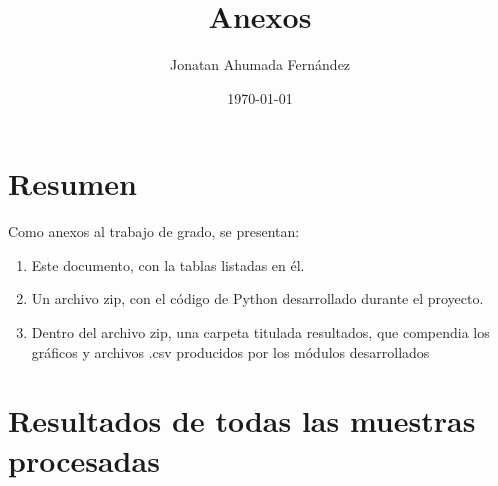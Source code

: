 \documentclass[11pt]{article}
\author{Jonatan Ahumada Fernández}
\date{\today}
\title{Anexos}
\begin{document}
\maketitle
\tableofcontents


\section{Resumen}
\label{sec:orgf2b99ac}

Como anexos al trabajo de grado, se presentan:

\begin{enumerate}
\item Este documento, con la tablas listadas en él.
\item Un archivo zip, con el código de Python desarrollado durante el
proyecto.
\item Dentro del archivo zip, una carpeta titulada resultados, que compendia los gráficos y archivos .csv producidos por los módulos desarrollados
\end{enumerate}



\newpage
\appendix



\tiny
\section{Resultados de todas las muestras procesadas}
\end{document}
